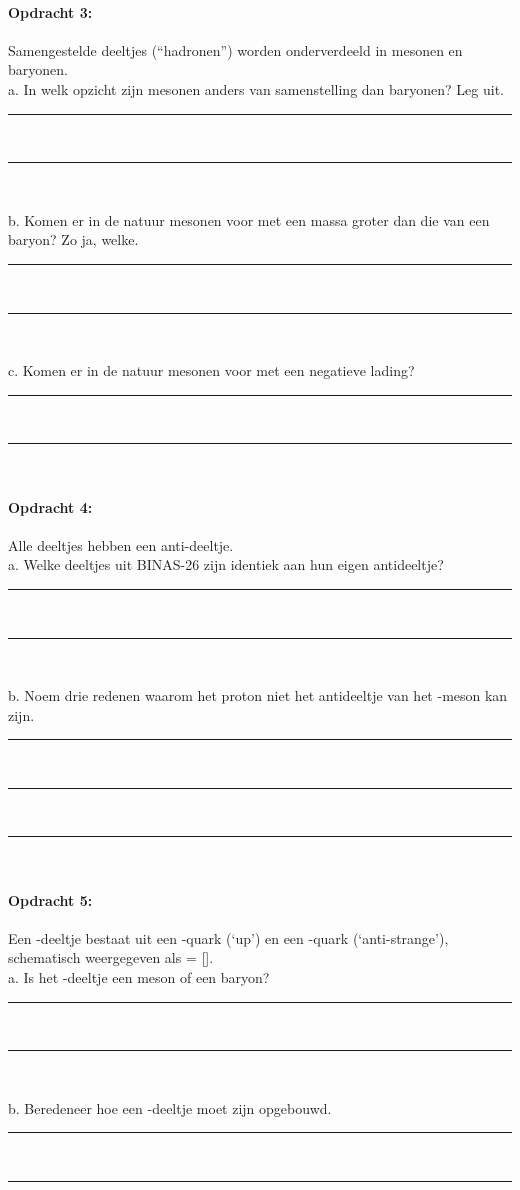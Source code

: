 \paragraph{Opdracht 3:}
Samengestelde deeltjes (``hadronen'') worden onderverdeeld in mesonen en baryonen.\\
a. In welk opzicht zijn mesonen anders van samenstelling dan baryonen? Leg uit.
\begin{center}
    \rule{\textwidth}{0.3mm}\\
    \rule{\textwidth}{0.3mm}\\
\end{center}
b. Komen er in de natuur mesonen voor met een massa groter dan die van een baryon?
Zo ja, welke.
\begin{center}
    \rule{\textwidth}{0.3mm}\\
    \rule{\textwidth}{0.3mm}\\
\end{center}
c. Komen er in de natuur mesonen voor met een negatieve lading?
\begin{center}
    \rule{\textwidth}{0.3mm}\\
    \rule{\textwidth}{0.3mm}\\
\end{center}
\paragraph{Opdracht 4:}
Alle deeltjes hebben een anti-deeltje.\\
a. Welke deeltjes uit BINAS-26 zijn identiek aan hun eigen antideeltje?
\begin{center}
    \rule{\textwidth}{0.3mm}\\
    \rule{\textwidth}{0.3mm}\\
\end{center}
b. Noem drie redenen waarom het proton niet het antideeltje van het \Ppiplus-meson kan zijn.
\begin{center}
    \rule{\textwidth}{0.3mm}\\
    \rule{\textwidth}{0.3mm}\\
    \rule{\textwidth}{0.3mm}\\
\end{center}

\paragraph{Opdracht 5:}
Een \PKplus -deeltje bestaat uit een \Pup -quark (`up') en een \APqs-quark 
(`anti-strange'), schematisch weergegeven als \PKplus = [\Pup\APqs].\\
a. Is het \PKplus -deeltje een meson of een baryon?
\begin{center}
    \rule{\textwidth}{0.3mm}\\
    \rule{\textwidth}{0.3mm}\\
\end{center}
b. Beredeneer hoe een \PKm-deeltje moet zijn opgebouwd.
\begin{center}
    \rule{\textwidth}{0.3mm}\\
    \rule{\textwidth}{0.3mm}\\   
\end{center}

